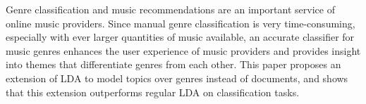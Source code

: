 Genre classification and music recommendations are an important service of online music providers. Since manual genre classification is very time-consuming, especially with ever larger quantities of music available, an accurate classifier for music genres enhances the user experience of music providers and provides insight into themes that differentiate genres from each other. This paper proposes an extension of LDA to model topics over genres instead of documents, and shows that this extension outperforms regular LDA on classification tasks.
